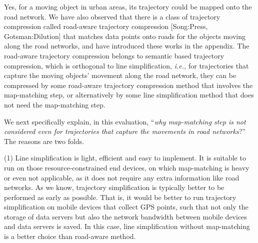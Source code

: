 \documentclass{letter}
\newcommand{\ie}{\emph{i.e.,}\xspace}
\begin{document}
Yes, for a moving object in urban areas, its trajectory could be mapped onto the road network. We have also observed that there is a class of trajectory compression called road-aware trajectory compression [Song:Press, Gotsman:Dilution] that matches data points onto roads  for the objects moving along the road networks, and  have introduced these works in the appendix. The road-aware trajectory compression belongs to semantic based trajectory compression, which is orthogonal to line simplification, \ie for trajectories that capture the moving objects' movement along the road network, they can be compressed by some road-aware trajectory compression method that involves the map-matching step, or alternatively by some line simplification method that does not need the map-matching step. %


We next specifically explain, in this evaluation, ``\emph{why map-matching step is not considered even for trajectories that capture the movements in road networks}?''
The reasons are two folds.

(1) Line simplification is light, efficient and easy to implement. It is suitable to run on those resource-constrained end devices, on which map-matching is heavy or even not applicable, as it does not require any extra information like road networks. As we know, trajectory simplification is typically better to be performed as early as possible. That is, it would be better to run trajectory simplification on mobile devices that collect GPS points, such that not only the storage of data servers but also the network bandwidth between mobile devices and data servers is saved. In this case, line simplification without map-matching is a better choice than road-aware method.
\end{document}
